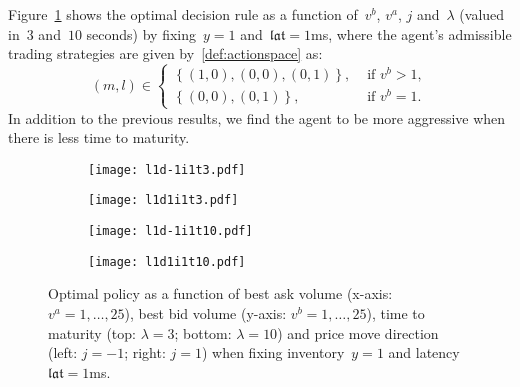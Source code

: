 \documentclass{amsart}[11pt]
\numberwithin{equation}{section}
\theoremstyle{definition}
\begin{document}
Figure~\ref{Fig:OS1lct} shows the optimal decision rule as a function of~$v^b$, $v^a$, $j$ and~$\lambda$ (valued in~$3$ and~$10$ seconds) by fixing~$y = 1$ and~$\mathfrak{lat} = 1$ms, where the agent's admissible trading strategies are given by~\eqref{def:actionspace} as:
\begin{equation*}
(m, l)
\in
 \left\{
 \begin{array}{ll}
\left\{(1, 0),  (0 ,0), (0, 1)\right\}, & \text{ if }v^b > 1,\\
\left\{(0, 0), (0, 1)\right\}, & \text{ if }v^b = 1.
 \end{array}
\right.
\end{equation*}
In addition to the previous results, we find the agent to be more aggressive when there is less time to maturity. 

\begin{figure}[!htp]
\centering
	\begin{subfigure}
	\centering
	\texttt{[image: l1d-1i1t3.pdf]}
	\end{subfigure}
	\begin{subfigure}
	\centering
	\texttt{[image: l1d1i1t3.pdf]}
	\end{subfigure}
	\begin{subfigure}
	\centering
	\texttt{[image: l1d-1i1t10.pdf]}
	\end{subfigure}
	\begin{subfigure}
	\centering
	\texttt{[image: l1d1i1t10.pdf]}
	\end{subfigure}
\caption{Optimal policy as a function of best ask volume (x-axis: $v^a = 1, \dots, 25$),
best bid volume (y-axis: $v^b = 1, \dots, 25$), 
time to maturity (top: $\lambda = 3$; bottom: $\lambda = 10$)
and price move direction (left: $j = -1$; right: $j = 1$) when
fixing inventory~$y = 1$ and latency~$\mathfrak{lat} = 1$ms.}
\label{Fig:OS1lct}
\end{figure}
\end{document}
